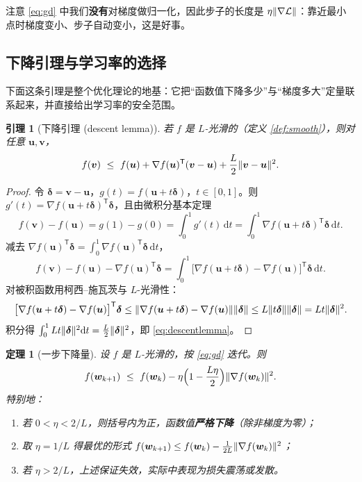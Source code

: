 \documentclass[UTF8,a4paper,11pt]{ctexart}
\theoremstyle{definition}
\theoremstyle{plain}
\newtheorem{theorem}[definition]{定理}
\newtheorem{lemma}[definition]{引理}
\theoremstyle{remark}
\DeclarePairedDelimiter{\norm}{\lVert}{\rVert}
\newcommand{\Loss}{\mathcal{L}}
\newcommand{\dd}{\mathrm{d}}
\newcommand{\T}{^{\mathsf{T}}}
\newcommand{\eng}[1]{\textup{(#1)}}
\begin{document}
注意 \eqref{eq:gd} 中我们\textbf{没有}对梯度做归一化，因此步子的长度是 $\eta\norm{\nabla\Loss}$：靠近最小点时梯度变小、步子自动变小，这是好事。

\subsection{下降引理与学习率的选择}

下面这条引理是整个优化理论的地基：它把“函数值下降多少”与“梯度多大”定量联系起来，并直接给出学习率的安全范围。

\begin{lemma}[下降引理 \eng{descent lemma}]\label{lem:descent}
若 $f$ 是 $L$-光滑的（定义 \ref{def:smooth}），则对任意 $\bm{u},\bm{v}$，
\begin{equation}\label{eq:descentlemma}
  f(\bm{v})\ \le\ f(\bm{u})+\nabla f(\bm{u})\T(\bm{v}-\bm{u})+\frac{L}{2}\norm{\bm{v}-\bm{u}}^2 .
\end{equation}
\end{lemma}

\begin{proof}
令 $\bm{\delta}=\bm{v}-\bm{u}$，$g(t)=f(\bm{u}+t\bm{\delta})$，$t\in[0,1]$。则 $g'(t)=\nabla f(\bm{u}+t\bm{\delta})\T\bm{\delta}$，且由微积分基本定理
\[
  f(\bm{v})-f(\bm{u})=g(1)-g(0)=\int_0^1 g'(t)\,\dd t=\int_0^1\nabla f(\bm{u}+t\bm{\delta})\T\bm{\delta}\,\dd t .
\]
减去 $\nabla f(\bm{u})\T\bm{\delta}=\int_0^1\nabla f(\bm{u})\T\bm{\delta}\,\dd t$，
\[
  f(\bm{v})-f(\bm{u})-\nabla f(\bm{u})\T\bm{\delta}
  =\int_0^1\big[\nabla f(\bm{u}+t\bm{\delta})-\nabla f(\bm{u})\big]\T\bm{\delta}\,\dd t .
\]
对被积函数用柯西--施瓦茨与 $L$-光滑性：
\[
  \big[\nabla f(\bm{u}+t\bm{\delta})-\nabla f(\bm{u})\big]\T\bm{\delta}
  \le\norm{\nabla f(\bm{u}+t\bm{\delta})-\nabla f(\bm{u})}\norm{\bm{\delta}}
  \le L\norm{t\bm{\delta}}\norm{\bm{\delta}}=Lt\norm{\bm{\delta}}^2 .
\]
积分得 $\int_0^1 Lt\norm{\bm{\delta}}^2\dd t=\tfrac{L}{2}\norm{\bm{\delta}}^2$，即 \eqref{eq:descentlemma}。
\end{proof}

\begin{theorem}[一步下降量]\label{thm:onestep}
设 $f$ 是 $L$-光滑的，按 \eqref{eq:gd} 迭代。则
\begin{equation}\label{eq:onestep}
  f(\bm{w}_{k+1})\ \le\ f(\bm{w}_k)-\eta\Big(1-\frac{L\eta}{2}\Big)\norm{\nabla f(\bm{w}_k)}^2 .
\end{equation}
特别地：
\begin{enumerate}[label=(\arabic*)]
  \item 若 $0<\eta<2/L$，则括号内为正，函数值\textbf{严格下降}（除非梯度为零）；
  \item 取 $\eta=1/L$ 得最优的形式 $f(\bm{w}_{k+1})\le f(\bm{w}_k)-\frac{1}{2L}\norm{\nabla f(\bm{w}_k)}^2$；
  \item 若 $\eta>2/L$，上述保证失效，实际中表现为损失震荡或发散。
\end{enumerate}
\end{theorem}
\end{document}
